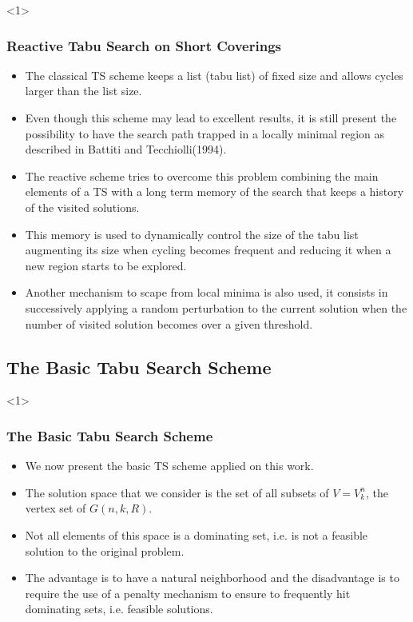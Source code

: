 \documentclass{beamer}
\begin{document}
\begin{frame}<1>
  \frametitle{Reactive Tabu Search on Short Coverings}

{ \footnotesize
  \begin{itemize}
  
		\item The classical TS scheme keeps a list (tabu list) of fixed size and allows cycles larger than the list size.
 		\item Even though this scheme may lead to excellent results, it is still present the possibility to
have the search path trapped in a locally minimal region as described in Battiti and Tecchiolli(1994).
		\item The reactive scheme tries to overcome this problem combining the main elements of a TS with a long term memory of the search that keeps a history of the visited solutions.
		\item This memory is used to dynamically control the size of the tabu list augmenting its size when cycling becomes frequent and reducing it when a new region starts to be explored.
		\item Another mechanism to scape from local minima is also used, it consists in successively applying a random perturbation to the current solution when the number of visited solution becomes over a given threshold.
  \end{itemize}
}
\end{frame}

\subsection{The Basic Tabu Search Scheme}

\begin{frame}<1>
  \frametitle{The Basic Tabu Search Scheme}

{ %

  \begin{itemize}
  	\item We now present the basic TS scheme applied on this work.
		\item The solution space that we consider is the set of all subsets of $V = V_k^n$, the vertex set of $G(n,k,R)$.
		\item Not all elements of this space is a dominating set, i.e. is not a feasible solution to the original problem.  	
  	\item The advantage is to have a natural neighborhood and the disadvantage is to require the use of a penalty mechanism to
ensure to frequently hit dominating sets, i.e. feasible solutions.
  \end{itemize}

}
\end{frame}
\end{document}
